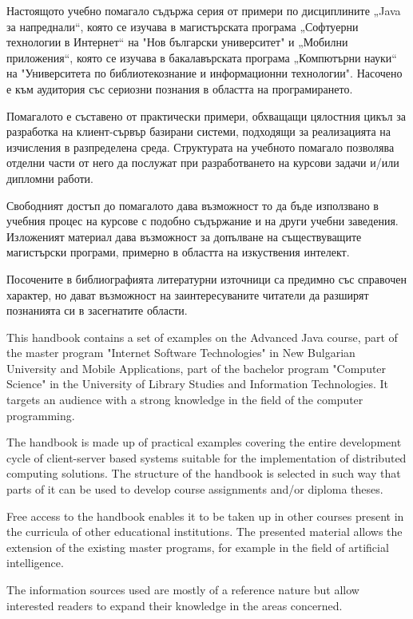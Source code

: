 Настоящото учебно помагало съдържа серия от примери по дисциплините „Java за напреднали“, която се изучава в магистърската програма „Софтуерни технологии в Интернет“ на "Нов български университет" и „Мобилни приложения“, която се изучава в бакалавърската програма „Компютърни науки“ на "Университета по библиотекознание и информационни технологии". Насочено е към аудитория със сериозни познания в областта на програмирането. 

Помагалото е съставено от практически примери, обхващащи цялостния цикъл за разработка на клиент-сървър базирани системи, подходящи за реализацията на изчисления в разпределена среда. Структурата на учебното помагало позволява отделни части от него да послужат при разработването на курсови задачи и/или дипломни работи.

Свободният достъп до помагалото дава възможност то да бъде използвано в учебния процес на курсове с подобно съдържание и на други учебни заведения. Изложеният материал дава възможност за допълване на съществуващите магистърски програми, примерно в областта на изкуствения интелект.

Посочените в библиографията литературни източници са предимно със справочен характер, но дават възможност на заинтересуваните читатели да разширят познанията си в засегнатите области. 

This handbook contains a set of examples on the Advanced Java course, part of the master program "Internet Software Technologies" in New Bulgarian University and Mobile Applications, part of the bachelor program "Computer Science" in the University of Library Studies and Information Technologies. It targets an audience with a strong knowledge in the field of the computer programming.

The handbook is made up of practical examples covering the entire development cycle of client-server based systems suitable for the implementation of distributed computing solutions. The structure of the handbook is selected in such way that parts of it can be used to develop course assignments and/or diploma theses.

Free access to the handbook enables it to be taken up in other courses present in the curricula of other educational institutions. The presented material allows the extension of the existing master programs, for example in the field of artificial intelligence.

The information sources used are mostly of a reference nature but allow interested readers to expand their knowledge in the areas concerned.

